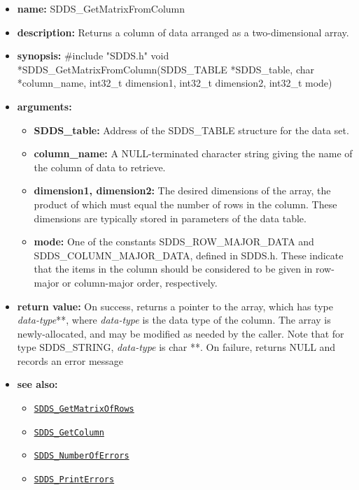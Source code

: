 \documentclass[11pt]{article}
\newcommand{\progref}[1]{\hyperref[SDDS_#1]{\tt SDDS\_#1}}
\begin{document}
\begin{itemize}
\item {\bf name:}\newline
SDDS\_GetMatrixFromColumn
\item {\bf description:}\newline
Returns a column of data arranged as a two-dimensional array.
\item {\bf synopsis:} \#include "SDDS.h"\newline
void *SDDS\_GetMatrixFromColumn(SDDS\_TABLE *SDDS\_table, char *column\_name, int32\_t dimension1, int32\_t dimension2, int32\_t mode)
\item {\bf arguments:}
\begin{itemize}
\item {\bf SDDS\_table:} Address of the SDDS\_TABLE structure for the data set.
\item {\bf column\_name:} A NULL-terminated character string giving the name of the column of data to retrieve.
\item {\bf dimension1, dimension2:} The desired dimensions of the array, the product of which must equal the number of rows in the column. These dimensions are typically stored in parameters of the data table.
\item {\bf mode:} One of the constants SDDS\_ROW\_MAJOR\_DATA and SDDS\_COLUMN\_MAJOR\_DATA, defined in SDDS.h. These indicate that the items in the column should be considered to be given in row-major or column-major order, respectively.
\end{itemize}
\item {\bf return value:}\newline
On success, returns a pointer to the array, which has type {\em data-type}**, where {\em data-type} is the data type of the column. The array is newly-allocated, and may be modified as needed by the caller. Note that for type SDDS\_STRING, {\em data-type} is char **.\newline
\newline
On failure, returns NULL and records an error message
\item {\bf see also:}
\begin{itemize}
\item \progref{GetMatrixOfRows}
\item \progref{GetColumn}
\item \progref{NumberOfErrors}
\item \progref{PrintErrors}
\end{itemize}
\end{itemize}
\end{document}
